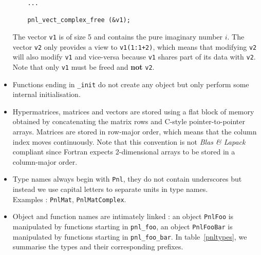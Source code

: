 \documentclass[a4paper,11pt,twoside]{article}
\begin{document}
\begin{itemize}
\begin{verbatim}
    ...

    pnl_vect_complex_free (&v1);
    \end{verbatim}
    The vector \verb!v1! is of size 5 and contains the pure imaginary number
    $i$. The vector \verb!v2! only provides a view to \verb!v1(1:1+2)!, which
    means that modifying \verb!v2! will also modify \verb!v1! and vice-versa
    because \verb!v1! shares part of its data with \verb!v2!. Note that only
    \verb!v1! must be freed and {\bf not} \verb!v2!.
  
  \item Functions ending in \verb!_init! do not create any object but only
    perform some internal initialisation.
  
  \item Hypermatrices, matrices and vectors are stored using a flat block of
    memory obtained by concatenating the matrix rows and C-style
    pointer-to-pointer arrays. Matrices are stored in row-major order, which
    means that the column index moves continuously.
    Note that this convention is not \textit{Blas \& Lapack} compliant since
    Fortran expects 2-dimensional arrays to be stored in a column-major order.

  \item Type names always begin with \verb!Pnl!, they do not contain underscores
    but instead we use capital letters to separate units in type names. \\
    Examples : \verb!PnlMat!, \verb!PnlMatComplex!.

  \item Object and function names are intimately linked : an object
    \verb!PnlFoo! is manipulated by functions starting in \verb!pnl_foo!, an
    object \verb!PnlFooBar! is manipulated by functions starting in
    \verb!pnl_foo_bar!. In table~\ref{pnltypes}, we summarise the types and their
    corresponding prefixes.


\end{itemize}
\end{document}
